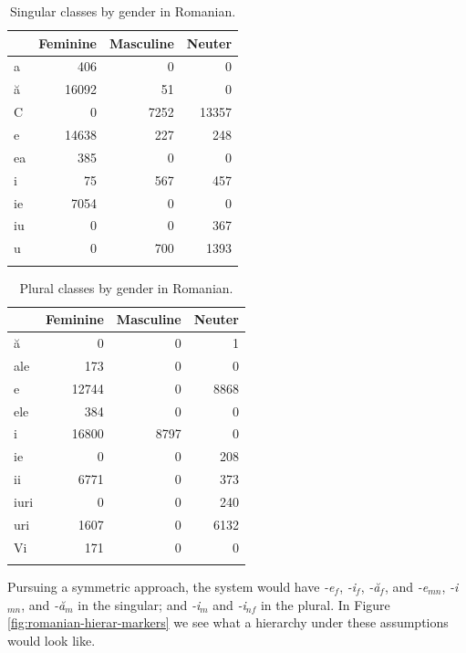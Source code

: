 \begin{table}[!htpb]
  \centering
  \begin{tabular}{lrrr}
    \lsptoprule
    & Feminine & Masculine & Neuter \\
    \midrule
    a  & 406     & 0        & 0      \\
    ă  & 16092   & 51       & 0      \\
    C  & 0       & 7252     & 13357  \\
    e  & 14638   & 227      & 248    \\
    ea & 385     & 0        & 0      \\
    i  & 75      & 567      & 457    \\
    ie & 7054    & 0        & 0      \\
    iu & 0       & 0        & 367    \\
    u  & 0       & 700      & 1393   \\
    \lspbottomrule
  \end{tabular}
  \caption{Singular classes by gender in Romanian.}\label{tab:sing-rom-gender}
\end{table}

\begin{table}[!htpb]
  \centering
  \begin{tabular}{lrrr}
    \lsptoprule
    & Feminine & Masculine & Neuter \\
    \midrule
    ă    & 0       & 0        & 1      \\
    ale  & 173     & 0        & 0      \\
    e    & 12744   & 0        & 8868   \\
    ele  & 384     & 0        & 0      \\
    i    & 16800   & 8797     & 0      \\
    ie   & 0       & 0        & 208    \\
    ii   & 6771    & 0        & 373    \\
    iuri & 0       & 0        & 240    \\
    uri  & 1607    & 0        & 6132   \\
    Vi   & 171     & 0        & 0      \\
    \lspbottomrule
  \end{tabular}
  \caption{Plural classes by gender in Romanian.}\label{tab:plur-rom-gender}
\end{table}

Pursuing a symmetric approach, the system would have \textit{-e}$_{f}$, \textit{-i}$_{f}$, \textit{-ă}$_{f}$, and \textit{-e}$_{mn}$, \textit{-i}$_{mn}$, and \textit{-ă}$_{m}$ in the singular; and \textit{-i}$_{m}$ and \textit{-i}$_{nf}$ in the plural. In  Figure \ref{fig:romanian-hierar-markers} we see what a hierarchy under these assumptions would look like.

